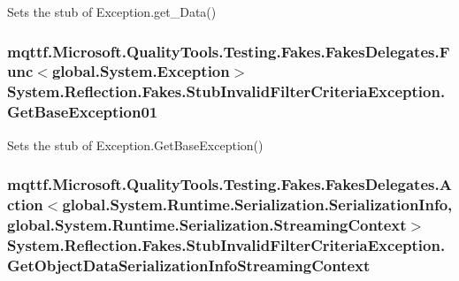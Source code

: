 Sets the stub of Exception.\-get\-\_\-\-Data()

\hypertarget{class_system_1_1_reflection_1_1_fakes_1_1_stub_invalid_filter_criteria_exception_a877b9ff9bcd60474e6b83d146c9bddae}{
\subsubsection[{Get\-Base\-Exception01}]{\setlength{\rightskip}{0pt plus 5cm}mqttf.\-Microsoft.\-Quality\-Tools.\-Testing.\-Fakes.\-Fakes\-Delegates.\-Func$<$global.\-System.\-Exception$>$ System.\-Reflection.\-Fakes.\-Stub\-Invalid\-Filter\-Criteria\-Exception.\-Get\-Base\-Exception01}}\label{class_system_1_1_reflection_1_1_fakes_1_1_stub_invalid_filter_criteria_exception_a877b9ff9bcd60474e6b83d146c9bddae}


Sets the stub of Exception.\-Get\-Base\-Exception()

\hypertarget{class_system_1_1_reflection_1_1_fakes_1_1_stub_invalid_filter_criteria_exception_ae36df7f5346169f8bf112cb92c6abd54}{
\subsubsection[{Get\-Object\-Data\-Serialization\-Info\-Streaming\-Context}]{\setlength{\rightskip}{0pt plus 5cm}mqttf.\-Microsoft.\-Quality\-Tools.\-Testing.\-Fakes.\-Fakes\-Delegates.\-Action$<$global.\-System.\-Runtime.\-Serialization.\-Serialization\-Info, global.\-System.\-Runtime.\-Serialization.\-Streaming\-Context$>$ System.\-Reflection.\-Fakes.\-Stub\-Invalid\-Filter\-Criteria\-Exception.\-Get\-Object\-Data\-Serialization\-Info\-Streaming\-Context}}\label{class_system_1_1_reflection_1_1_fakes_1_1_stub_invalid_filter_criteria_exception_ae36df7f5346169f8bf112cb92c6abd54}


